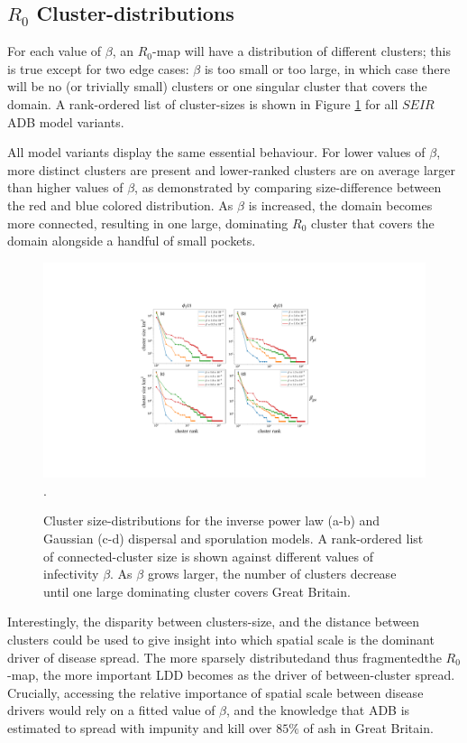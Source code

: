 \subsection{$R_0$ Cluster-distributions}
\label{R0-over-beta}

For each value of $\beta$, an $R_0$-map will have a distribution of different clusters; 
this is true except for two edge cases: $\beta$ is too small or too large, in which case there will be no (or trivially small) clusters or one singular cluster that covers the domain.
A rank-ordered list of cluster-sizes is shown in Figure \ref{fig6:cluster-size-distributions} for all $SEIR$ ADB model variants.

All model variants display the same essential behaviour. 
For lower values of $\beta$, more distinct clusters are present and lower-ranked clusters are on average larger than higher values of $\beta$,
as demonstrated by comparing size-difference between the red and blue colored distribution.
As $\beta$ is increased, the domain becomes more connected, resulting in one large, dominating $R_0$ cluster that covers the domain alongside a handful of small pockets.

\begin{figure}
    \centering
    \includegraphics[scale=0.50]{chapter6/figures/fig6-cluster-size-distribution.pdf}.
    \caption{Cluster size-distributions for the inverse power law (a-b) and Gaussian (c-d) dispersal and sporulation models. A rank-ordered list of connected-cluster size is shown against different values of infectivity $\beta$. As $\beta$ grows larger, the number of clusters decrease until one large dominating cluster covers Great Britain.}
    \label{fig6:cluster-size-distributions}
\end{figure}

Interestingly, the disparity between clusters-size, and the distance between clusters could be used to give insight into
which spatial scale is the dominant driver of disease spread.
The more sparsely distributed\textemdash and thus fragmented\textemdash the $R_0$-map, the more important LDD becomes as the driver of between-cluster spread.
Crucially, accessing the relative importance of spatial scale between disease drivers would rely on a fitted value of $\beta$,
and the knowledge that ADB is estimated to spread with impunity and kill over $85\%$ of ash in Great Britain.

